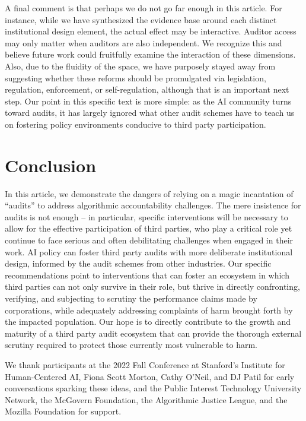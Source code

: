 \documentclass[sigconf]{acmart}
\begin{document}
A final comment is that perhaps we do not go far enough in this article. For instance, while we have synthesized the evidence base around each distinct institutional design element, the actual effect may be interactive. Auditor access may only matter when auditors are also independent. We recognize this and believe future work could fruitfully examine the interaction of these dimensions. Also, due to the fluidity of the space, we have purposely stayed away from suggesting whether these reforms should be promulgated via legislation, regulation, enforcement, or self-regulation, although that is an important next step.
Our point in this specific text is more simple: as the AI community turns toward audits, it has largely ignored what other audit schemes have to teach us on fostering policy environments conducive to third party participation.
\vspace{-3mm}
\section{Conclusion}
In this article, we demonstrate the dangers of relying on a magic incantation of “audits” to address algorithmic accountability challenges.
The mere insistence for audits is not enough -- in particular, specific interventions will be necessary to allow for the effective participation of third parties, who play a critical role 
yet continue to face serious and often debilitating challenges when engaged in their work. 
AI policy can foster third party audits with more deliberate institutional design, informed by the audit schemes from other industries. Our specific recommendations point to interventions that can foster an ecosystem in which third parties can not only survive in their role, but thrive in directly confronting, verifying, and subjecting to scrutiny the performance claims made by corporations, while adequately addressing complaints of harm brought forth by the impacted population. 
Our hope is 
to directly contribute to the growth and maturity of a third party audit ecosystem that can provide the thorough external scrutiny required to protect those currently most vulnerable to harm.

\begin{acks}
We thank participants at the 2022 Fall Conference at Stanford's Institute for Human-Centered AI, Fiona Scott Morton, Cathy O'Neil, and DJ Patil for early conversations sparking these ideas, and the Public Interest Technology University Network, the McGovern Foundation, the Algorithmic Justice League, and the Mozilla Foundation for support. 
\end{acks}


\appendix
\end{document}

